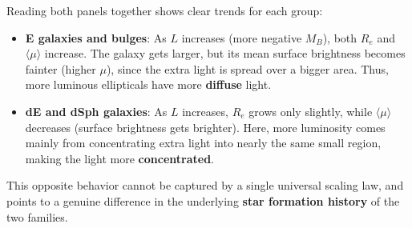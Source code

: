 \begin{minipage}{0.5\textwidth}
\end{minipage}
\hfill
\begin{minipage}{0.47\textwidth}
    Reading both panels together shows clear trends for each group:

    \smallskip

\begin{itemize}
    \item \textbf{E galaxies and bulges}: As $L$ increases (more negative $M_B$), both $R_e$ and $\langle\mu\rangle$ increase. The galaxy gets larger, but its mean surface brightness becomes fainter (higher $\mu$), since the extra light is spread over a bigger area. Thus, more luminous ellipticals have more \textbf{diffuse} light.

    \item \textbf{dE and dSph galaxies}: As $L$ increases, $R_e$ grows only slightly, while $\langle\mu\rangle$ decreases (surface brightness gets brighter). Here, more luminosity comes mainly from concentrating extra light into nearly the same small region, making the light more \textbf{concentrated}.
\end{itemize}

\smallskip

This opposite behavior cannot be captured by a single universal scaling law, and points to a genuine difference in the underlying \textbf{star formation history} of the two families.
\end{minipage}

